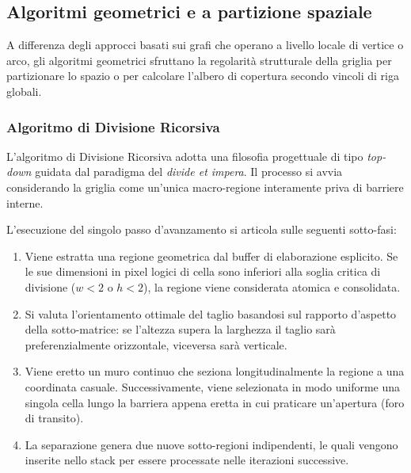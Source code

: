 \documentclass[12pt, a4paper]{article}
\begin{document}
	\subsection{Algoritmi geometrici e a partizione spaziale}
	A differenza degli approcci basati sui grafi che operano a livello locale di vertice o arco, gli algoritmi geometrici sfruttano la regolarità strutturale della griglia per partizionare lo spazio o per calcolare l'albero di copertura secondo vincoli di riga globali.
	
	\subsubsection{Algoritmo di Divisione Ricorsiva}
	L'algoritmo di Divisione Ricorsiva adotta una filosofia progettuale di tipo \textit{top-down} guidata dal paradigma del \textit{divide et impera}. Il processo si avvia considerando la griglia come un'unica macro-regione interamente priva di barriere interne. 
	
	L'esecuzione del singolo passo d'avanzamento si articola sulle seguenti sotto-fasi:
	\begin{enumerate}
		\item Viene estratta una regione geometrica dal buffer di elaborazione esplicito. Se le sue dimensioni in pixel logici di cella sono inferiori alla soglia critica di divisione ($w < 2$ o $h < 2$), la regione viene considerata atomica e consolidata.
		\item Si valuta l'orientamento ottimale del taglio basandosi sul rapporto d'aspetto della sotto-matrice: se l'altezza supera la larghezza il taglio sarà preferenzialmente orizzontale, viceversa sarà verticale.
		\item Viene eretto un muro continuo che seziona longitudinalmente la regione a una coordinata casuale. Successivamente, viene selezionata in modo uniforme una singola cella lungo la barriera appena eretta in cui praticare un'apertura (foro di transito).
		\item La separazione genera due nuove sotto-regioni indipendenti, le quali vengono inserite nello stack per essere processate nelle iterazioni successive.
	\end{enumerate}
	
\end{document}
